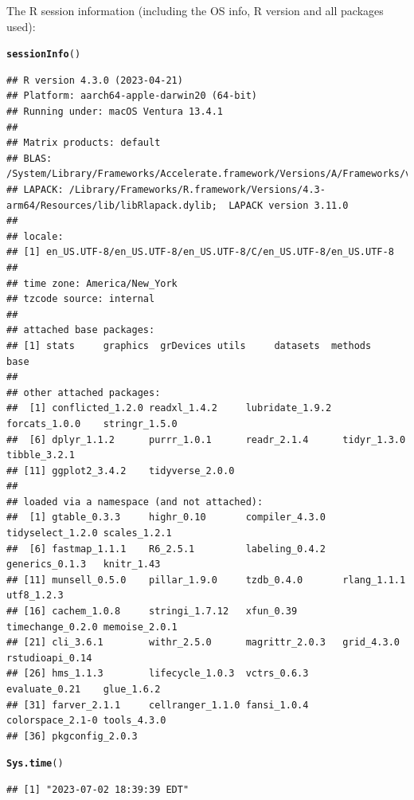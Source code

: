 \documentclass{article}\usepackage[]{graphicx}\usepackage[]{xcolor}
\makeatletter
\newcommand{\hlstd}[1]{\textcolor[rgb]{0.345,0.345,0.345}{#1}}%
\newcommand{\hlkwd}[1]{\textcolor[rgb]{0.737,0.353,0.396}{\textbf{#1}}}%
\newenvironment{kframe}{%
 \def\at@end@of@kframe{}%
 \ifinner\ifhmode%
  \def\at@end@of@kframe{\end{minipage}}%
  \begin{minipage}{\columnwidth}%
 \fi\fi%
 \def\FrameCommand##1{\hskip\@totalleftmargin \hskip-\fboxsep
 \colorbox{shadecolor}{##1}\hskip-\fboxsep
     \hskip-\linewidth \hskip-\@totalleftmargin \hskip\columnwidth}%
 \MakeFramed {\advance\hsize-\width
   \@totalleftmargin\z@ \linewidth\hsize
   \@setminipage}}%
 {\par\unskip\endMakeFramed%
 \at@end@of@kframe}
\newenvironment{knitrout}{}{} %
\makeatother
\begin{document}
The R session information (including the OS info, R version and all
packages used):

\begin{knitrout}
\color{fgcolor}\begin{kframe}
\begin{alltt}
\hlkwd{sessionInfo}\hlstd{()}
\end{alltt}
\begin{verbatim}
## R version 4.3.0 (2023-04-21)
## Platform: aarch64-apple-darwin20 (64-bit)
## Running under: macOS Ventura 13.4.1
## 
## Matrix products: default
## BLAS:   /System/Library/Frameworks/Accelerate.framework/Versions/A/Frameworks/vecLib.framework/Versions/A/libBLAS.dylib 
## LAPACK: /Library/Frameworks/R.framework/Versions/4.3-arm64/Resources/lib/libRlapack.dylib;  LAPACK version 3.11.0
## 
## locale:
## [1] en_US.UTF-8/en_US.UTF-8/en_US.UTF-8/C/en_US.UTF-8/en_US.UTF-8
## 
## time zone: America/New_York
## tzcode source: internal
## 
## attached base packages:
## [1] stats     graphics  grDevices utils     datasets  methods   base     
## 
## other attached packages:
##  [1] conflicted_1.2.0 readxl_1.4.2     lubridate_1.9.2  forcats_1.0.0    stringr_1.5.0   
##  [6] dplyr_1.1.2      purrr_1.0.1      readr_2.1.4      tidyr_1.3.0      tibble_3.2.1    
## [11] ggplot2_3.4.2    tidyverse_2.0.0 
## 
## loaded via a namespace (and not attached):
##  [1] gtable_0.3.3     highr_0.10       compiler_4.3.0   tidyselect_1.2.0 scales_1.2.1    
##  [6] fastmap_1.1.1    R6_2.5.1         labeling_0.4.2   generics_0.1.3   knitr_1.43      
## [11] munsell_0.5.0    pillar_1.9.0     tzdb_0.4.0       rlang_1.1.1      utf8_1.2.3      
## [16] cachem_1.0.8     stringi_1.7.12   xfun_0.39        timechange_0.2.0 memoise_2.0.1   
## [21] cli_3.6.1        withr_2.5.0      magrittr_2.0.3   grid_4.3.0       rstudioapi_0.14 
## [26] hms_1.1.3        lifecycle_1.0.3  vctrs_0.6.3      evaluate_0.21    glue_1.6.2      
## [31] farver_2.1.1     cellranger_1.1.0 fansi_1.0.4      colorspace_2.1-0 tools_4.3.0     
## [36] pkgconfig_2.0.3
\end{verbatim}
\begin{alltt}
\hlkwd{Sys.time}\hlstd{()}
\end{alltt}
\begin{verbatim}
## [1] "2023-07-02 18:39:39 EDT"
\end{verbatim}
\end{kframe}
\end{knitrout}
\end{document}
